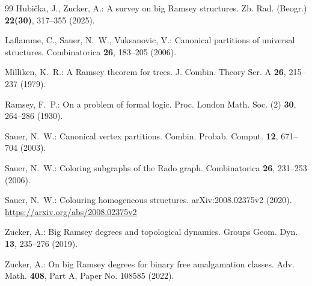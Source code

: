 \documentclass{article}
\numberwithin{equation}{section}
\theoremstyle{definition}
\begin{document}
\begin{thebibliography}{99}
Hubi\v cka, J., Zucker, A.: A survey on big Ramsey structures.
Zb. Rad. (Beogr.) \textbf{22(30)}, 317--355 (2025).

Laflamme, C., Sauer, N.~W., Vuksanovic, V.: Canonical partitions of universal
structures. Combinatorica \textbf{26}, 183--205 (2006).

Milliken, K.~R.: A Ramsey theorem for trees.
J. Combin. Theory Ser. A \textbf{26}, 215--237 (1979).

Ramsey, F.~P.: On a problem of formal logic.
Proc. London Math. Soc. (2) \textbf{30}, 264--286 (1930).

Sauer, N.~W.: Canonical vertex partitions.
Combin. Probab. Comput. \textbf{12}, 671--704 (2003).

Sauer, N.~W.: Coloring subgraphs of the Rado graph.
Combinatorica \textbf{26}, 231--253 (2006).

Sauer, N.~W.: Colouring homogeneous structures.
arXiv:2008.02375v2 (2020).
\url{https://arxiv.org/abs/2008.02375v2}

Zucker, A.: Big Ramsey degrees and topological dynamics.
Groups Geom. Dyn. \textbf{13}, 235--276 (2019).

Zucker, A.: On big Ramsey degrees for binary free amalgamation classes.
Adv. Math. \textbf{408}, Part A, Paper No. 108585 (2022).

\end{thebibliography}
\end{document}

